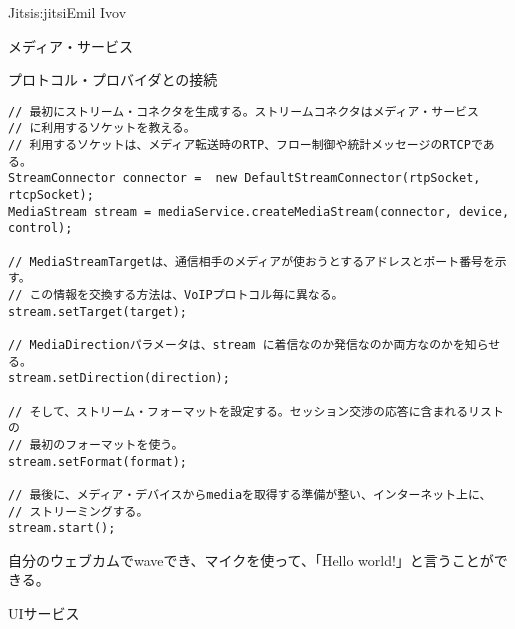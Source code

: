 \begin{aosachapter}{Jitsi}{s:jitsi}{Emil Ivov}
\begin{aosasect1}{メディア・サービス}
\begin{aosasect2}{プロトコル・プロバイダとの接続}



\begin{verbatim}
// 最初にストリーム・コネクタを生成する。ストリームコネクタはメディア・サービス
// に利用するソケットを教える。
// 利用するソケットは、メディア転送時のRTP、フロー制御や統計メッセージのRTCPである。
StreamConnector connector =  new DefaultStreamConnector(rtpSocket, rtcpSocket);
MediaStream stream = mediaService.createMediaStream(connector, device, control);

// MediaStreamTargetは、通信相手のメディアが使おうとするアドレスとポート番号を示す。
// この情報を交換する方法は、VoIPプロトコル毎に異なる。
stream.setTarget(target);

// MediaDirectionパラメータは、stream に着信なのか発信なのか両方なのかを知らせる。
stream.setDirection(direction);

// そして、ストリーム・フォーマットを設定する。セッション交渉の応答に含まれるリストの
// 最初のフォーマットを使う。
stream.setFormat(format);

// 最後に、メディア・デバイスからmediaを取得する準備が整い、インターネット上に、
// ストリーミングする。
stream.start();
\end{verbatim}

\noindent 自分のウェブカムでwaveでき、マイクを使って、「Hello world!」と言うことができる。

\end{aosasect2}

\end{aosasect1}

\begin{aosasect1}{UIサービス}


\end{aosasect1}
\end{aosachapter}
